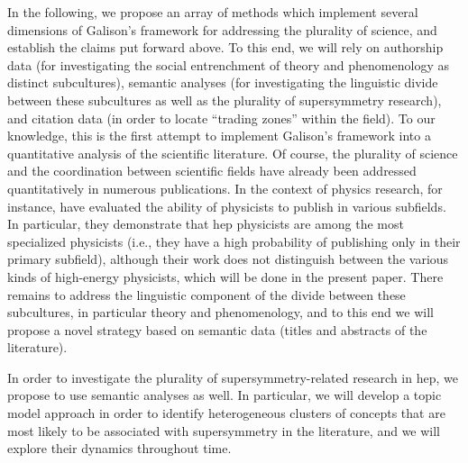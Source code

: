 \documentclass[smallextended]{svjour3}
\begin{document}
In the following, we propose an array of methods which implement several dimensions of Galison's framework for addressing the plurality of science, and establish the claims put forward above. To this end, we will rely on authorship data (for investigating the social entrenchment of theory and phenomenology as distinct subcultures), semantic analyses (for investigating the linguistic divide between these subcultures as well as the plurality of supersymmetry research), and citation data (in order to locate ``trading zones'' within the field). To our knowledge, this is the first attempt to implement Galison's framework into a quantitative analysis of the scientific literature. Of course, the plurality of science and the coordination between scientific fields have already been addressed quantitatively in numerous publications. In the context of physics research, for instance, \citet{Battiston2019} have evaluated the ability of physicists to publish in various subfields. In particular, they demonstrate that \gls{hep} physicists are among the most specialized physicists (i.e., they have a high probability of publishing only in their primary subfield), although their work does not distinguish between the various kinds of high-energy physicists, which will be done in the present paper. There remains to address the linguistic component of the divide between these subcultures, in particular theory and phenomenology, and to this end we will propose a novel strategy based on semantic data (titles and abstracts of the literature).

In order to investigate the plurality of supersymmetry-related research in \gls{hep}, we propose to use semantic analyses as well. In particular, we will develop a topic model approach in order to identify heterogeneous clusters of concepts that are most likely to be associated with supersymmetry in the literature, and we will explore their dynamics throughout time.
\end{document}
